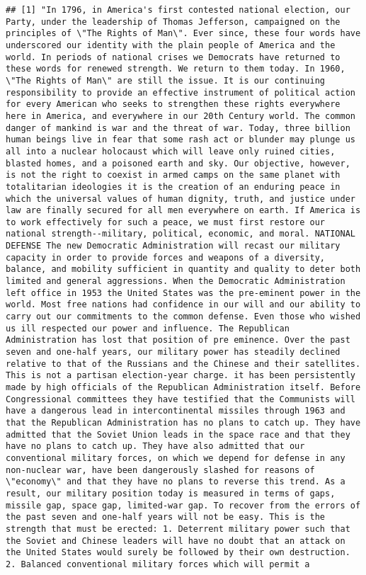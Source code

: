 \documentclass[
]{article}
\begin{document}
\begin{verbatim}
## [1] "In 1796, in America's first contested national election, our Party, under the leadership of Thomas Jefferson, campaigned on the principles of \"The Rights of Man\". Ever since, these four words have underscored our identity with the plain people of America and the world. In periods of national crises we Democrats have returned to these words for renewed strength. We return to them today. In 1960, \"The Rights of Man\" are still the issue. It is our continuing responsibility to provide an effective instrument of political action for every American who seeks to strengthen these rights everywhere here in America, and everywhere in our 20th Century world. The common danger of mankind is war and the threat of war. Today, three billion human beings live in fear that some rash act or blunder may plunge us all into a nuclear holocaust which will leave only ruined cities, blasted homes, and a poisoned earth and sky. Our objective, however, is not the right to coexist in armed camps on the same planet with totalitarian ideologies it is the creation of an enduring peace in which the universal values of human dignity, truth, and justice under law are finally secured for all men everywhere on earth. If America is to work effectively for such a peace, we must first restore our national strength--military, political, economic, and moral. NATIONAL DEFENSE The new Democratic Administration will recast our military capacity in order to provide forces and weapons of a diversity, balance, and mobility sufficient in quantity and quality to deter both limited and general aggressions. When the Democratic Administration left office in 1953 the United States was the pre-eminent power in the world. Most free nations had confidence in our will and our ability to carry out our commitments to the common defense. Even those who wished us ill respected our power and influence. The Republican Administration has lost that position of pre eminence. Over the past seven and one-half years, our military power has steadily declined relative to that of the Russians and the Chinese and their satellites. This is not a partisan election-year charge. it has been persistently made by high officials of the Republican Administration itself. Before Congressional committees they have testified that the Communists will have a dangerous lead in intercontinental missiles through 1963 and that the Republican Administration has no plans to catch up. They have admitted that the Soviet Union leads in the space race and that they have no plans to catch up. They have also admitted that our conventional military forces, on which we depend for defense in any non-nuclear war, have been dangerously slashed for reasons of \"economy\" and that they have no plans to reverse this trend. As a result, our military position today is measured in terms of gaps, missile gap, space gap, limited-war gap. To recover from the errors of the past seven and one-half years will not be easy. This is the strength that must be erected: 1. Deterrent military power such that the Soviet and Chinese leaders will have no doubt that an attack on the United States would surely be followed by their own destruction. 2. Balanced conventional military forces which will permit a 
\end{verbatim}
\end{document}
